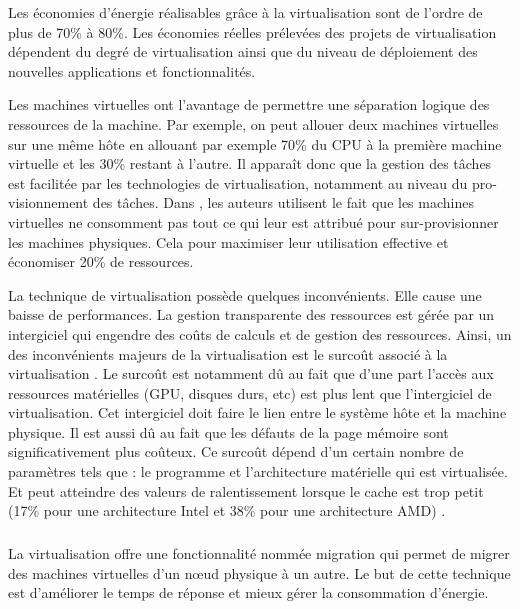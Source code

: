 \begin{onehalfspace}
Les économies d'énergie réalisables grâce à la virtualisation sont de l'ordre de plus de 70\% à 80\%. Les économies réelles prélevées des projets de virtualisation dépendent du degré de virtualisation ainsi que du niveau de déploiement des nouvelles applications et fonctionnalités\cite{WEB26}.\medskip 

Les machines virtuelles ont l'avantage de permettre une séparation logique des ressources de la machine. Par exemple, on peut allouer deux machines virtuelles sur une même hôte en allouant par exemple 70\% du CPU à la première machine virtuelle et les 30\% restant à l'autre. Il apparaît donc que la gestion des tâches est facilitée par les technologies de virtualisation, notamment au niveau du pro-visionnement des tâches. Dans \cite{ref27}, les auteurs utilisent le fait que les machines virtuelles ne consomment pas tout ce qui leur est attribué pour sur-provisionner les machines physiques. Cela pour maximiser leur utilisation effective et économiser 20\% de ressources.\medskip 

La technique de virtualisation possède quelques inconvénients. Elle cause une baisse de performances. La gestion transparente des ressources est gérée par un intergiciel qui engendre des coûts de calculs et de gestion des ressources. Ainsi, un des inconvénients majeurs de la virtualisation est le surcoût associé à la virtualisation \cite{ref28}. Le surcoût est notamment dû au fait que d’une part l'accès aux ressources matérielles (GPU, disques durs, etc) est plus lent que l'intergiciel de virtualisation. Cet intergiciel  doit faire le lien entre le système hôte et la machine physique. Il est aussi dû au fait que les défauts de la page mémoire sont significativement plus coûteux. Ce surcoût dépend d'un certain nombre de paramètres tels que : le programme et l'architecture matérielle qui est virtualisée. Et peut atteindre des valeurs de ralentissement lorsque le cache est trop petit  (17\% pour une architecture Intel et 38\% pour une architecture AMD) \cite{ref28}.


\subparagraph{}La virtualisation offre une fonctionnalité nommée migration qui permet de migrer des machines virtuelles d'un nœud physique à un autre. Le but de cette technique est d'améliorer le temps de réponse et mieux gérer la consommation d'énergie.
\end{onehalfspace}


